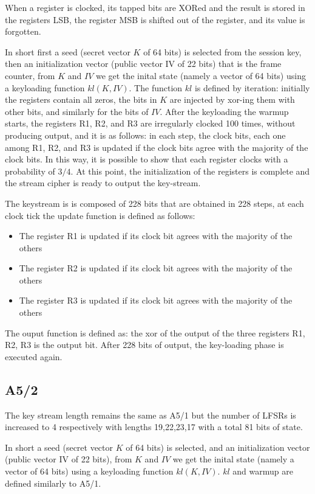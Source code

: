 When a register is clocked, its tapped bits are XORed and the result is stored in the registers LSB, the register MSB is shifted out of the register, and its value is forgotten.

In short first a seed (secret vector $K$ of 64 bits) is selected from the session key, then an initialization vector (public vector IV of 22 bits) that is the frame counter, from $K$ and $IV$ we get the inital state (namely a vector of 64 bits) using a keyloading function $kl(K,IV)$. The function $kl$ is defined by iteration: initially the registers contain all zeros, the bits in $K$ are injected by xor-ing them with other bits, and similarly for the bits of $IV$.
After the keyloading the warmup starts, the registers R1, R2, and R3 are irregularly clocked 100 times, without producing output, and it is as follows: in each step, the clock bits, each one among R1, R2, and R3 is updated if the clock bits agree with the majority of the clock bits. In this way, it is possible to show that each register clocks with a probability of $3/4$. At this point, the initialization of the registers is complete and the stream cipher is ready to output the key-stream. 

The keystream is is composed of 228 bits that are obtained in 228 steps, at each clock tick the update function is defined as follows:
\begin{itemize}
	\item The register R1 is updated if its clock bit agrees with the majority of the others
	\item The register R2 is updated if its clock bit agrees with the majority of the others
	\item The register R3 is updated if its clock bit agrees with the majority of the others
\end{itemize}

The ouput function is defined as: the xor of the output of the three registers R1, R2, R3 is the output bit.
After 228 bits of output, the key-loading phase is executed again.

\subsection{A5/2}

The key stream length remains the same as A5/1 but the number of LFSRs is increased to 4 respectively with lengths 19,22,23,17 with a total 81 bits of state.

In short a seed (secret vector $K$ of 64 bits) is selected, and an initialization vector (public vector IV of 22 bits), from $K$ and $IV$ we get the inital state (namely a vector of 64 bits) using a keyloading function $kl(K,IV)$. $kl$ and warmup are defined similarly to A5/1.

